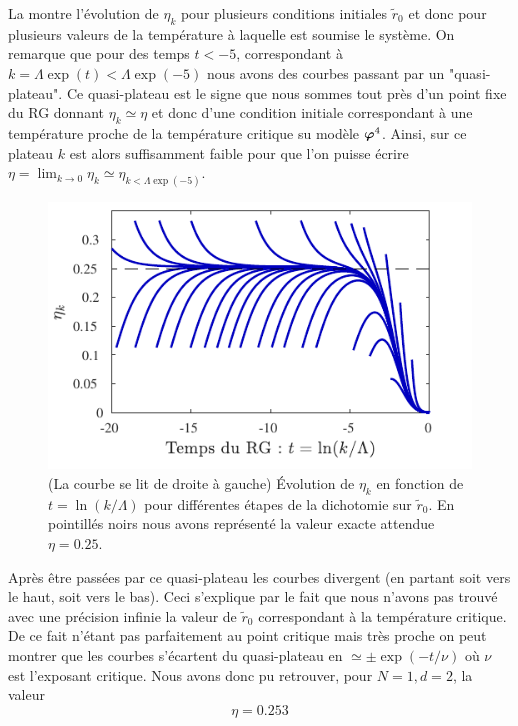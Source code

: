 \documentclass[10.5pt]{article}
\begin{document}
\begin{multicols*}{2}
La  montre l'évolution de $\eta_k$ pour plusieurs conditions initiales $\tilde{r}_0$ et donc pour plusieurs valeurs de la température à laquelle est soumise le système. On remarque que pour des temps $t<-5$, correspondant à $k = \Lambda\exp(t)< \Lambda \exp(-5)$ nous avons des courbes passant par un "quasi-plateau". Ce quasi-plateau est le signe que nous sommes tout près d'un point fixe du RG donnant $\eta_k \simeq \eta$ et donc d'une condition initiale correspondant à une température proche de la température critique su modèle $\boldsymbol{ \varphi}^4$. Ainsi, sur ce plateau $k$ est alors suffisamment faible pour que l'on puisse écrire $\eta = \lim_{k\to 0} \eta_k \simeq \eta_{k<\Lambda\exp(-5)}$. 
\begin{figure}[H]
	\begin{center}
		\includegraphics[width=0.95\columnwidth]{etakd2.pdf}
		\caption{(La courbe se lit de droite à gauche) Évolution de $\eta_k$ en fonction de $t= \ln(k/\Lambda)$ pour différentes étapes de la dichotomie sur $\tilde{r}_0$. En pointillés noirs nous avons représenté la valeur exacte attendue $\eta = 0.25$. }
		\label{fig:etakd2}
	\end{center}
\end{figure}
\vspace*{-20pt}
Après être passées par ce quasi-plateau les courbes divergent (en partant soit vers le haut, soit vers le bas). Ceci s'explique par le fait que nous n'avons pas trouvé avec une précision infinie la valeur de $\tilde{r}_0$ correspondant à la température critique. De ce fait n'étant pas parfaitement au point critique mais très proche on peut montrer que les courbes s'écartent du quasi-plateau en $\simeq \pm \exp(-t/\nu)$ où $\nu$ est l'exposant critique. Nous avons donc pu retrouver, pour $N=1, d =2$, la valeur
\begin{equation}
	\eta = 0.253 %
\end{equation}


\end{multicols*}
\end{document}
